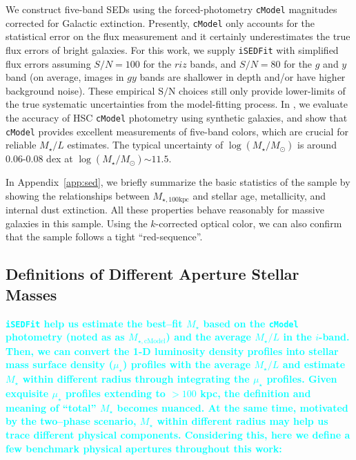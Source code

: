\documentclass[a4paper,fleqn,usenatbib]{mnras}
\def\cmodel{\texttt{cModel}}
\def\mstar{{$M_{\star}$}}
\def\logms{{$\log (M_{\star}/M_{\odot})$}}
\def\mtot{{$M_{\star,100\mathrm{kpc}}$}}
\def\mcmodel{{$M_{\star,\mathrm{cModel}}$}}
\def\m2l{{$M_{\star}/L$}}
\def\s2n{{$\mathrm{S}/\mathrm{N}$}}
\def\mden{{$\mu_{\star}$}}
\newcommand{\song}[1]{\textcolor{cyan}{\textbf{#1}}}
\begin{document}
    We construct five-band SEDs using the forced-photometry \cmodel{} magnitudes 
    corrected for Galactic extinction. 
    Presently, \cmodel{} only accounts for the statistical error on the flux 
    measurement and it certainly underestimates the true flux errors of bright 
    galaxies.  
    For this work, we supply \texttt{iSEDFit} with simplified flux errors assuming 
    $S/N = 100$ for the $riz$ bands, and $S/N = 80$ for the $g$ and $y$ band 
    (on average, images in $gy$ bands are shallower in depth and/or have higher 
    background noise).  
    These empirical \s2n{} choices still only provide lower-limits of the true 
    systematic uncertainties from the model-fitting process. 
    In \citealt{SynPipe}, we evaluate the accuracy of HSC \cmodel{} photometry 
    using synthetic galaxies, and show that \cmodel{} provides excellent measurements 
    of five-band colors, which are crucial for reliable \m2l{} estimates.
    The typical uncertainty of \logms{} is around 0.06-0.08 dex at \logms${\sim} 11.5$.
    
    In Appendix~\ref{app:sed}, we briefly summarize the basic statistics of 
    the sample by showing the relationships between \mtot{} and stellar age, 
    metallicity, and internal dust extinction. 
    All these properties behave reasonably for massive galaxies in this sample. 
    Using the $k$-corrected optical color, we can also confirm that the sample follows 
    a tight ``red-sequence''.  
      


\subsection{Definitions of Different Aperture Stellar Masses}
    \label{ssec:mtotal}
    
    \song{
    \texttt{iSEDFit} help us estimate the best--fit \mstar{} based on the \cmodel{} 
    photometry (noted as as \mcmodel{}) and the average \m2l{} in the $i$-band. 
    Then, we can convert the 1-D luminosity density profiles into stellar mass 
    surface density (\mden{}) profiles with the average \m2l{} and estimate \mstar{} 
    within different radius through integrating the \mden{} profiles. 
    Given exquisite \mden{} profiles extending to $>100$ kpc, the definition and meaning 
    of ``total'' \mstar{} becomes nuanced.
    At the same time, motivated by the two--phase scenario, \mstar{} within different 
    radius may help us trace different physical components. 
    Considering this, here we define a few benchmark physical apertures throughout 
    this work:   
    }
\end{document}
